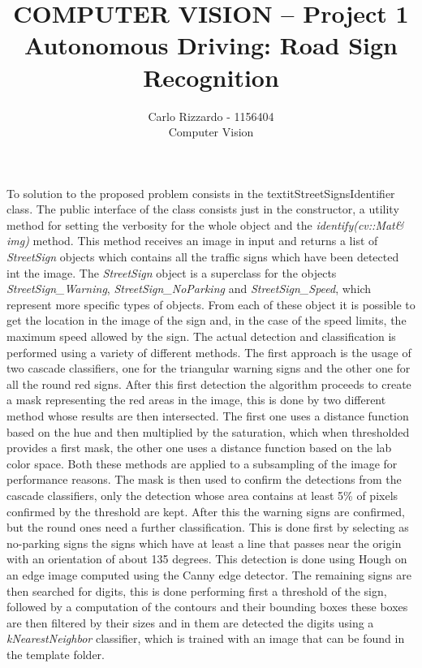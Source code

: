\documentclass[12pt]{article}
\begin{document}
 
 
 
\title{COMPUTER VISION – Project 1
Autonomous Driving: Road Sign Recognition}%
\author{Carlo Rizzardo - 1156404\\ %
Computer Vision} %
 
\maketitle


To solution to the proposed problem consists in the textit{StreetSignsIdentifier} class.
The public interface of the class consists just in the constructor, a utility method for setting the verbosity for the whole object and
the \textit{identify(cv::Mat\& img)} method. This method receives an image in input and returns a list of \textit{StreetSign}
objects which contains all the traffic signs which have been detected int the image. The \textit{StreetSign} object is a superclass
for the objects \textit{StreetSign\_Warning}, \textit{StreetSign\_NoParking} and \textit{StreetSign\_Speed}, which represent 
more specific types of objects. From each of these object it is possible to get the location in the image of the sign
and, in the case of the speed limits, the maximum speed allowed by the sign.
The actual detection and classification is performed using a variety of different methods. The first approach is the usage
of two cascade classifiers, one for the triangular warning signs and the other one for all the round red signs.
After this first detection the algorithm proceeds to create a mask representing the red areas in the image, this is 
done by two different method whose results are then intersected. The first one uses a distance function based on the hue and then
multiplied by the saturation, which when thresholded provides a first mask, the other one uses a distance function 
based on the lab color space. Both these methods are applied to a subsampling of the image for performance reasons.
The mask is then used to confirm the detections from the cascade classifiers, only the detection whose area contains at
least 5\% of pixels confirmed by the threshold are kept.
After this the warning signs are confirmed, but the round ones need a further classification. This is done first by selecting
as no-parking signs the signs which have at least a line that passes near the origin with an orientation of about 135 degrees.
This detection is done using Hough on an edge image computed using the Canny edge detector. The remaining signs are then searched 
for digits, this is done performing first a threshold of the sign, followed by a computation of the contours and their bounding boxes
these boxes are then filtered by their sizes and in them are detected the digits using a \textit{kNearestNeighbor} classifier, which 
is trained with an image that can be found in the template folder.
\end{document}
